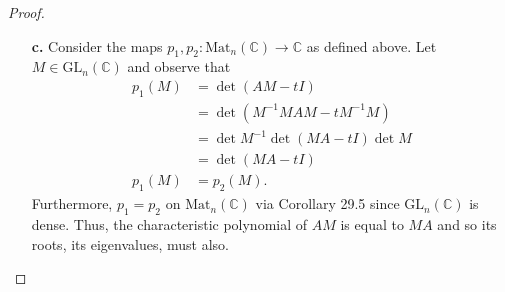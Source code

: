 \documentclass[ 12pt ]{article}
\begin{document}
\begin{enumerate}
\begin{proof}
\begin{enumerate}
				\item[\textbf{c.}] Consider the maps $p_1, p_2 : \mathrm{Mat}_n(\mathbb{C}) \to \mathbb{C}$ as defined above. Let $M \in \mathrm{GL}_n(\mathbb{C})$ and observe that
					\begin{align*}
						p_1(M) &= \det( AM - tI ) \\
						&= \det( M^{-1}MAM - tM^{-1}M ) \\
						&= \det M^{-1} \det( MA - tI ) \det M \\
						&= \det( MA - tI ) \\
						p_1(M) &= p_2(M).
					\end{align*}
					Furthermore, $p_1 = p_2$ on $\mathrm{Mat}_n(\mathbb{C})$ via Corollary 29.5 since $\mathrm{GL}_n(\mathbb{C})$ is dense. Thus, the characteristic polynomial of $AM$
					is equal to $MA$ and so its roots, its eigenvalues, must also.
			\end{enumerate}
		\end{proof}


\end{enumerate}
\end{document}
